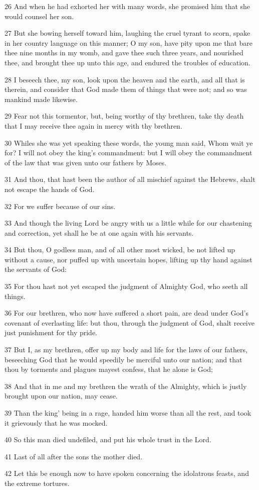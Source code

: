 \par 26 And when he had exhorted her with many words, she promised him that she would counsel her son.
\par 27 But she bowing herself toward him, laughing the cruel tyrant to scorn, spake in her country language on this manner; O my son, have pity upon me that bare thee nine months in my womb, and gave thee such three years, and nourished thee, and brought thee up unto this age, and endured the troubles of education.
\par 28 I beseech thee, my son, look upon the heaven and the earth, and all that is therein, and consider that God made them of things that were not; and so was mankind made likewise.
\par 29 Fear not this tormentor, but, being worthy of thy brethren, take thy death that I may receive thee again in mercy with thy brethren.
\par 30 Whiles she was yet speaking these words, the young man said, Whom wait ye for? I will not obey the king's commandment: but I will obey the commandment of the law that was given unto our fathers by Moses.
\par 31 And thou, that hast been the author of all mischief against the Hebrews, shalt not escape the hands of God.
\par 32 For we suffer because of our sins.
\par 33 And though the living Lord be angry with us a little while for our chastening and correction, yet shall he be at one again with his servants.
\par 34 But thou, O godless man, and of all other most wicked, be not lifted up without a cause, nor puffed up with uncertain hopes, lifting up thy hand against the servants of God:
\par 35 For thou hast not yet escaped the judgment of Almighty God, who seeth all things.
\par 36 For our brethren, who now have suffered a short pain, are dead under God's covenant of everlasting life: but thou, through the judgment of God, shalt receive just punishment for thy pride.
\par 37 But I, as my brethren, offer up my body and life for the laws of our fathers, beseeching God that he would speedily be merciful unto our nation; and that thou by torments and plagues mayest confess, that he alone is God;
\par 38 And that in me and my brethren the wrath of the Almighty, which is justly brought upon our nation, may cease.
\par 39 Than the king' being in a rage, handed him worse than all the rest, and took it grievously that he was mocked.
\par 40 So this man died undefiled, and put his whole trust in the Lord.
\par 41 Last of all after the sons the mother died.
\par 42 Let this be enough now to have spoken concerning the idolatrous feasts, and the extreme tortures.

